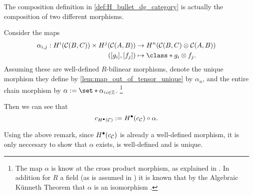 \begin{remark}
    \label{rem:H_bullet_composition_alpha}
    The composition definition in \autoref{def:H_bullet_dg_category} is actually the composition of two different morphisms.

    Consider the maps
    \begin{align*}
        \alpha_{i, j}: H^i(\Cc(B, C)) \times H^j(\Cc(A, B)) &\to H^n(\Cc(B, C) \otimes \Cc(A, B)) \\
        ([g_i], [f_j]) &\mapsto \class*{g_i \otimes f_j}.
    \end{align*}
    Assuming these are well-defined \( R \)-bilinear morphisms, denote the unique morphism they define by \autoref{lem:map_out_of_tensor_unique} by \( \alpha_n \), and the entire chain morphism by \( \alpha := \set*{\alpha_i}_{i \in \Zb} \). \footnote{
        The map \( \alpha \) is know at the cross product morphism, as explained in \cite[p. 273]{Hatcher_2002}. In addition for \( R \) a field (as is assumed in \cite{Jasso-Muro_2023}) it is known that by the Algebraic Künneth Theorem that \( \alpha \) is an isomorphism \cite[Theorem 3B.5]{Hatcher_2002}.
    }
    
    Then we can see that
    \[
        c_{H^\bullet({\mathcal{C}})} := H^\bullet(c_{{\mathcal{C}}}) \circ \alpha.
    \] 
\end{remark}

Using the above remark, since \( H^{\bullet}(c_{{\mathcal{C}}}) \) is already a well-defined morphism, it is only neccesary to show that \( \alpha \) exists, is well-defined and is unique.

